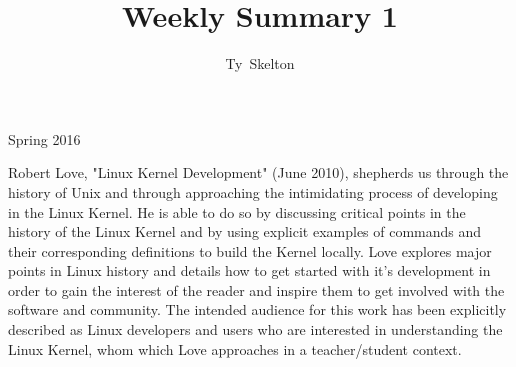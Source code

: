 \documentclass[10pt,draftclsnofoot,onecolumn]{IEEEtran}
\begin{document}
\singlespacing
\title{Weekly Summary 1}

\author{Ty~Skelton}


%
{Spring 2016}

\maketitle
\IEEEpeerreviewmaketitle

Robert Love, "Linux Kernel Development" (June 2010), shepherds us through the history of Unix and through approaching the intimidating process of developing in the Linux Kernel.
He is able to do so by discussing critical points in the history of the Linux Kernel and by using explicit examples of commands and their corresponding definitions to build the Kernel locally.
Love explores major points in Linux history and details how to get started with it's development in order to gain the interest of the reader and inspire them to get involved with the software and community.
The intended audience for this work has been explicitly described as Linux developers and users who are interested in understanding the Linux Kernel, whom which Love approaches in a teacher/student context.
\end{document}
